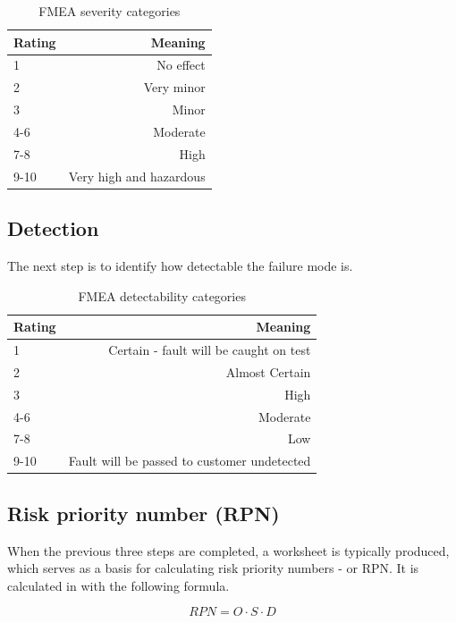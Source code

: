 \documentclass[10pt,oneside]{book}                  %
\begin{document}
\begin{table}[h]
\centering
    \begin{tabular}{ | l | r | }
    \hline
    Rating & Meaning \\ \hline \hline
    1      & No effect  \\ \hline
    2      & Very minor \\ \hline
    3      & Minor \\ \hline
    4-6    & Moderate \\ \hline
    7-8    & High \\ \hline
    9-10   & Very high and hazardous \\ \hline
    \end{tabular}
\caption{FMEA severity categories}
\label{table:fmea_severities}
\end{table}


\subsection{Detection}
\label{sec:fmea_detection}
The next step is to identify how detectable the failure mode is.
\begin{table}[h]
\centering
    \begin{tabular}{ | l | r | }
    \hline
    Rating & Meaning \\ \hline \hline
    1      & Certain - fault will be caught on test  \\ \hline
    2      & Almost Certain \\ \hline
    3      & High \\ \hline
    4-6    & Moderate \\ \hline
    7-8    & Low \\ \hline
    9-10   & Fault will be passed to customer undetected \\ \hline
    \end{tabular}
\caption{FMEA detectability categories}
\label{table:fmea_detectability}
\end{table}

\subsection{Risk priority number (RPN)}
When the previous three steps are completed, a worksheet is typically produced, which serves as a basis for calculating risk priority numbers - or RPN. It is calculated in with the following formula.

\begin{equation}
RPN = O \cdot S \cdot D
\end{equation}
\end{document}
